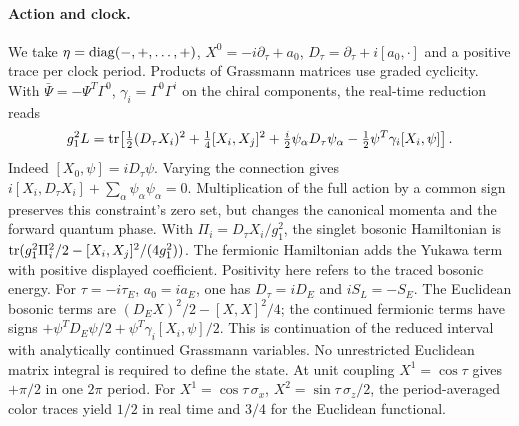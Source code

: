 \paragraph{Action and clock.}
We take \(\eta={\rm diag}(-,+,\ldots,+)\), \(X^0=-i\partial_\tau+a_0\),
\(D_\tau=\partial_\tau+i[a_0,\cdot]\) and a positive trace per clock period. Products of Grassmann matrices use graded cyclicity. With
\(\bar\Psi=-\Psi^T\Gamma^0\), \(\gamma_i=\Gamma^0\Gamma^i\) on the chiral components, the real-time reduction reads
\[
 g_1^2 L={\rm tr}\!\left[\tfrac12(D_\tau X_i)^2+\tfrac14[X_i,X_j]^2+
 \tfrac i2\psi_\alpha D_\tau\psi_\alpha
 -\tfrac12\psi^T\gamma_i[X_i,\psi]\right].
\]
Indeed \([X_0,\psi]=iD_\tau\psi\). Varying the connection gives
\(i[X_i,D_\tau X_i]+\sum_\alpha\psi_\alpha\psi_\alpha=0\). Multiplication of the full action by a common sign preserves this constraint's zero set, but changes the canonical momenta and the forward quantum phase. With \(\Pi_i=D_\tau X_i/g_1^2\), the singlet bosonic Hamiltonian is
\({\rm tr}(g_1^2\Pi_i^2/2-[X_i,X_j]^2/(4g_1^2))\).
The fermionic Hamiltonian adds the Yukawa term with positive displayed coefficient. Positivity here refers to the traced bosonic energy. For \(\tau=-i\tau_E\), \(a_0=i a_E\), one has \(D_\tau=iD_E\) and \(iS_L=-S_E\). The Euclidean bosonic terms are \((D_E X)^2/2-[X,X]^2/4\); the continued fermionic terms have signs \(+\psi^T D_E\psi/2+\psi^T\gamma_i[X_i,\psi]/2\). This is continuation of the reduced interval with analytically continued Grassmann variables. No unrestricted Euclidean matrix integral is required to define the state. At unit coupling \(X^1=\cos\tau\) gives \(+\pi/2\) in one \(2\pi\) period. For \(X^1=\cos\tau\,\sigma_x\), \(X^2=\sin\tau\,\sigma_z/2\), the period-averaged color traces yield \(1/2\) in real time and \(3/4\) for the Euclidean functional.

